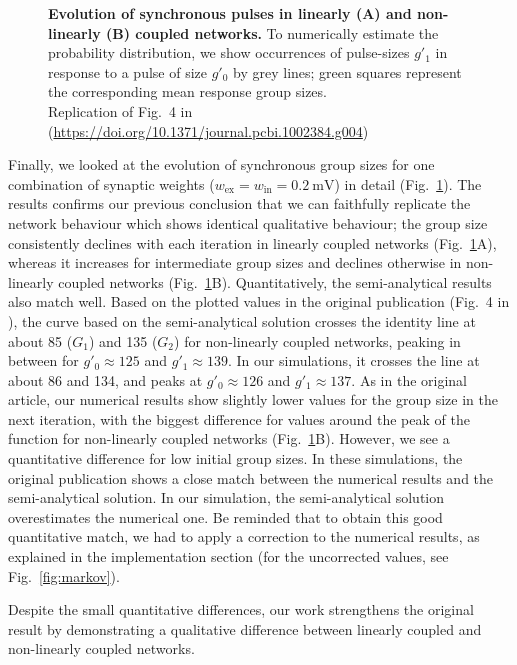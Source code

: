 \documentclass[10pt,a4paper,onecolumn]{article}
\begin{document}
\begin{figure}
\begin{subfigure}[t]{0.5\textwidth}
\end{subfigure}
\caption{\label{fig:markov_corrected}
\textbf{Evolution of synchronous pulses in linearly (A) and non-linearly (B) coupled networks.} To numerically estimate the probability distribution, we show occurrences of pulse-sizes $g'_1$ in response to a pulse of size $g'_0$ by grey lines; green squares represent the corresponding mean response group sizes.\\
Replication of Fig.~4 in \cite{Memmesheimer2012} (\url{https://doi.org/10.1371/journal.pcbi.1002384.g004})}
\end{figure}

Finally, we looked at the evolution of synchronous group sizes for one combination of synaptic weights ($w_\text{ex}=w_\text{in}=\SI{0.2}{\milli\volt}$) in detail (Fig.~\ref{fig:markov_corrected}). The results confirms our previous conclusion that we can faithfully replicate the network behaviour which shows identical qualitative behaviour; the group size consistently declines with each iteration in linearly coupled networks (Fig.~\ref{fig:markov_corrected}A), whereas it increases for intermediate group sizes and declines otherwise in non-linearly coupled networks (Fig.~\ref{fig:markov_corrected}B). Quantitatively, the semi-analytical results also match well. Based on the plotted values in the original publication (Fig.~4 in \cite{Memmesheimer2012}), the curve based on the semi-analytical solution crosses the identity line at about 85 ($G_1$) and 135 ($G_2$) for non-linearly coupled networks, peaking in between for $g'_0\approx125$ and $g'_1\approx139$. In our simulations, it crosses the line at about 86 and 134, and peaks at $g'_0\approx126$ and $g'_1\approx137$. As in the original article, our numerical results show slightly lower values for the group size in the next iteration, with the biggest difference for values around the peak of the function for non-linearly coupled networks (Fig.~\ref{fig:markov_corrected}B). However, we see a quantitative difference for low initial group sizes. In these simulations, the original publication shows a close match between the numerical results and the semi-analytical solution. In our simulation, the semi-analytical solution overestimates the numerical one.
Be reminded that to obtain this good quantitative match, we had to apply a correction to the numerical results, as explained in the implementation section (for the uncorrected values, see Fig.~\ref{fig:markov}).

Despite the small quantitative differences, our work strengthens the original result by demonstrating a qualitative difference between linearly coupled and non-linearly coupled networks.
\end{document}
